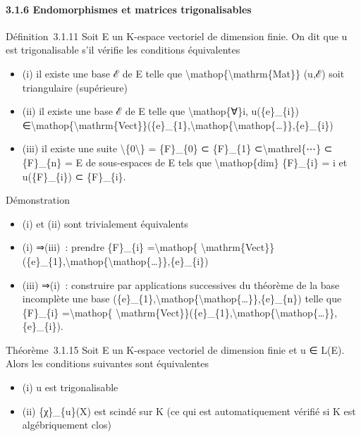 \documentclass[]{article}
\begin{document}
\paragraph{3.1.6 Endomorphismes et matrices trigonalisables}

Définition~3.1.11 Soit E un K-espace vectoriel de dimension finie. On
dit que u est trigonalisable s'il vérifie les conditions équivalentes

\begin{itemize}
\itemsep1pt\parskip0pt
\item
  (i) il existe une base ℰ de E telle que
  \textbackslash{}mathop\{\textbackslash{}mathrm\{Mat\}\} (u,ℰ) soit
  triangulaire (supérieure)
\item
  (ii) il existe une base ℰ de E telle que \textbackslash{}mathop\{∀\}i,
  u(\{e\}\_\{i\})
  ∈\textbackslash{}mathop\{\textbackslash{}mathrm\{Vect\}\}(\{e\}\_\{1\},\textbackslash{}mathop\{\textbackslash{}mathop\{\ldots{}\}\},\{e\}\_\{i\})
\item
  (iii) il existe une suite \textbackslash{}\{0\textbackslash{}\} =
  \{F\}\_\{0\} ⊂ \{F\}\_\{1\} ⊂\textbackslash{}mathrel\{⋯\} ⊂
  \{F\}\_\{n\} = E de sous-espaces de E tels que
  \textbackslash{}mathop\{dim\} \{F\}\_\{i\} = i et u(\{F\}\_\{i\}) ⊂
  \{F\}\_\{i\}.
\end{itemize}

Démonstration

\begin{itemize}
\itemsep1pt\parskip0pt
\item
  (i) et (ii) sont trivialement équivalents
\item
  (i) ⇒(iii)~: prendre \{F\}\_\{i\} =\textbackslash{}mathop\{
  \textbackslash{}mathrm\{Vect\}\}(\{e\}\_\{1\},\textbackslash{}mathop\{\textbackslash{}mathop\{\ldots{}\}\},\{e\}\_\{i\})
\item
  (iii) ⇒(i)~: construire par applications successives du théorème de la
  base incomplète une base
  (\{e\}\_\{1\},\textbackslash{}mathop\{\textbackslash{}mathop\{\ldots{}\}\},\{e\}\_\{n\})
  telle que \{F\}\_\{i\} =\textbackslash{}mathop\{
  \textbackslash{}mathrm\{Vect\}\}(\{e\}\_\{1\},\textbackslash{}mathop\{\textbackslash{}mathop\{\ldots{}\}\},\{e\}\_\{i\}).
\end{itemize}

Théorème~3.1.15 Soit E un K-espace vectoriel de dimension finie et u ∈
L(E). Alors les conditions suivantes sont équivalentes

\begin{itemize}
\itemsep1pt\parskip0pt
\item
  (i) u est trigonalisable
\item
  (ii) \{χ\}\_\{u\}(X) est scindé sur K (ce qui est automatiquement
  vérifié si K est algébriquement clos)
\end{itemize}
\end{document}
